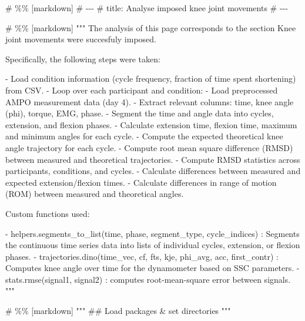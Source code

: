 \documentclass[
  11pt,
  a4paper]{article}
\newenvironment{Shaded}{\begin{snugshade}}{\end{snugshade}}
\newcommand{\CommentTok}[1]{\textcolor[rgb]{0.37,0.37,0.37}{#1}}
\begin{document}
\begin{Shaded}
\begin{Highlighting}[]
\CommentTok{\# \%\% [markdown]}
\CommentTok{\# {-}{-}{-}}
\CommentTok{\# title: Analyse imposed knee joint movements}
\CommentTok{\# {-}{-}{-}}

\CommentTok{\# \%\% [markdown]}
\CommentTok{"""}
\CommentTok{The analysis of this page corresponds to the section \textquotesingle{}Knee joint movements}
\CommentTok{were succesfuly imposed\textquotesingle{}.}

\CommentTok{Specifically, the following steps were taken:}

\CommentTok{{-}   Load condition information (cycle frequency, fraction of time spent shortening) from CSV.}
\CommentTok{{-}   Loop over each participant and condition:}
\CommentTok{    {-}   Load preprocessed AMPO measurement data (day 4).}
\CommentTok{    {-}   Extract relevant columns: time, knee angle (phi), torque, EMG, phase.}
\CommentTok{    {-}   Segment the time and angle data into cycles, extension, and flexion phases.}
\CommentTok{    {-}   Calculate extension time, flexion time, maximum and minimum angles for each cycle.}
\CommentTok{    {-}   Compute the expected theoretical knee angle trajectory for each cycle.}
\CommentTok{    {-}   Compute root mean square difference (RMSD) between measured and theoretical trajectories.}
\CommentTok{{-}   Compute RMSD statistics across participants, conditions, and cycles.}
\CommentTok{{-}   Calculate differences between measured and expected extension/flexion times.}
\CommentTok{{-}   Calculate differences in range of motion (ROM) between measured and theoretical angles.}

\CommentTok{Custom functions used:}

\CommentTok{{-}   \textasciigrave{}helpers.segments\_to\_list(time, phase, segment\_type, cycle\_indices)\textasciigrave{}}
\CommentTok{    : Segments the continuous time series data into lists of individual cycles, extension, or flexion phases.}
\CommentTok{{-}   \textasciigrave{}trajectories.dino(time\_vec, cf, fts, kje, phi\_avg, acc, first\_contr)\textasciigrave{} }
\CommentTok{    : Computes knee angle over time for the dynamometer based on SSC parameters.}
\CommentTok{{-}   \textasciigrave{}stats.rmse(signal1, signal2)\textasciigrave{}}
\CommentTok{    : computes root{-}mean{-}square error between signals.}
\CommentTok{    }
\CommentTok{"""}

\CommentTok{\# \%\% [markdown]}
\CommentTok{"""}
\CommentTok{\#\# Load packages \& set directories}
\CommentTok{"""}


\end{Highlighting}
\end{Shaded}
\end{document}
